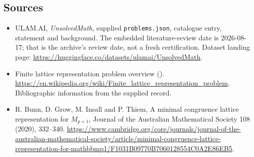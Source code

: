 \documentclass[11pt,a4paper]{article}
\begin{document}
\subsection{Sources}

{\small

\begin{itemize}

\item[\hypertarget{source:statement:1}{S1}] ULAM.AI, \emph{UnsolvedMath}, supplied \texttt{problems.json}, catalogue entry, statement and background. The embedded literature-review date is 2026-08-17; that is the archive’s review date, not a fresh certification. Dataset landing page: \url{https://huggingface.co/datasets/ulamai/UnsolvedMath}.

\item[\hypertarget{source:statement:2}{S2}] Finite lattice representation problem overview (). \url{https://en.wikipedia.org/wiki/Finite_lattice_representation_problem}. Bibliographic information from the supplied record.

\item[R1] R. Bunn, D. Grow, M. Insall and P. Thiem, A minimal congruence lattice representation for $M_{p+1}$, Journal of the Australian Mathematical Society 108 (2020), 332--340.
\url{https://www.cambridge.org/core/journals/journal-of-the-australian-mathematical-society/article/minimal-congruence-lattice-representation-for-mathbbmp1/F1031B09770B7060128554C0A2E86EB5}.
\end{itemize}

}

\label{end:statement}
\end{document}
